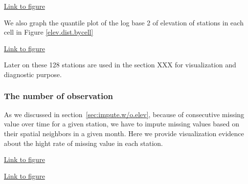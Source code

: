 \begin{framed}
\begin{center}
  \href{../plots/vertices.a1950.pdf}{Link to figure}
  \label{a1950.vertices}
\end{center}
\end{framed}

We also graph the quantile plot of the log base 2 of elevation of stations in each
cell in Figure \href{../plots/elev.dist.bycell.pdf}{\ref*{elev.dist.bycell}}

\begin{framed}
\begin{center}
  \href{../plots/elev.dist.bycell.pdf}{Link to figure}
  \label{elev.dist.bycell}
\end{center}
\end{framed}

Later on these 128 stations are used in the section XXX for visualization and 
diagnostic purpose.

\subsubsection{The number of observation}

As we discussed in section~\ref{sec:impute.w/o.elev}, because of consecutive 
missing value over time for a given station, we have to impute missing values 
based on their spatial neighbors in a given month. Here we provide visualization
evidence about the hight rate of missing value in each station.

\begin{framed}
\begin{center}
  \href{../plots/a1950/a1950.obs.station.pdf}{Link to figure}
  \label{quant.obs}
\end{center}
\end{framed}

\begin{framed}
\begin{center}
  \href{../plots/a1950/a1950.obsrate.station.pdf}{Link to figure}
  \label{quant.obsrate}
\end{center}
\end{framed}

